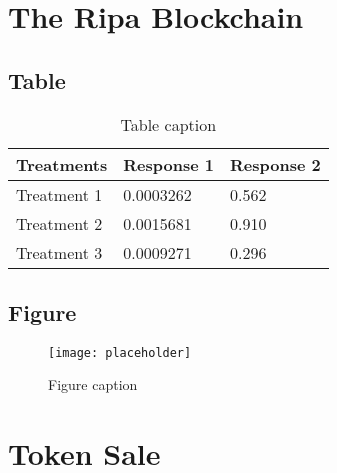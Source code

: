 \documentclass[11pt,fleqn,oneside]{book} %
\begin{document}


\chapter{The Ripa Blockchain}

\section{Table}

\begin{table}[h]
	\centering
	\begin{tabular}{l l l}
		\toprule
		\textbf{Treatments} & \textbf{Response 1} & \textbf{Response 2} \\
		\midrule
		Treatment 1         & 0.0003262           & 0.562               \\
		Treatment 2         & 0.0015681           & 0.910               \\
		Treatment 3         & 0.0009271           & 0.296               \\
		\bottomrule
	\end{tabular}
	\caption{Table caption}
\end{table}


\section{Figure}

\begin{figure}[h]
	\centering\texttt{[image: placeholder]}
	\caption{Figure caption}
\end{figure}




\chapter{Token Sale}
\end{document}
